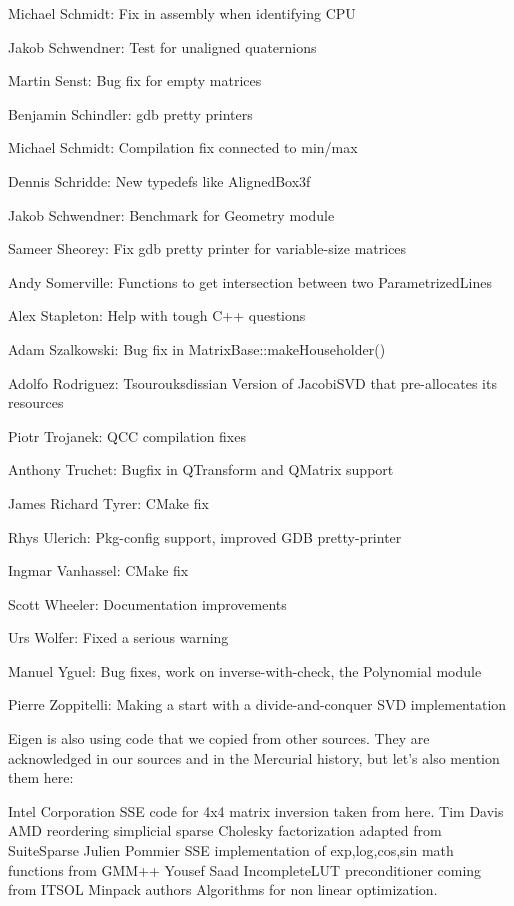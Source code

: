Michael Schmidt:  Fix in assembly when identifying CPU  

Jakob Schwendner:  Test for unaligned quaternions  

Martin Senst:  Bug fix for empty matrices  

Benjamin Schindler:  gdb pretty printers  

Michael Schmidt:  Compilation fix connected to min/max  

Dennis Schridde:  New typedefs like AlignedBox3f  

Jakob Schwendner:  Benchmark for Geometry module  

Sameer Sheorey:  Fix gdb pretty printer for variable-size matrices  

Andy Somerville:  Functions to get intersection between two ParametrizedLines  

Alex Stapleton:  Help with tough C++ questions  

Adam Szalkowski:  Bug fix in MatrixBase::makeHouseholder()  

Adolfo Rodriguez: Tsourouksdissian  Version of JacobiSVD that pre-allocates its resources  

Piotr Trojanek:  QCC compilation fixes  

Anthony Truchet:  Bugfix in QTransform and QMatrix support  

James Richard Tyrer:  CMake fix  

Rhys Ulerich:  Pkg-config support, improved GDB pretty-printer  

Ingmar Vanhassel:  CMake fix  

Scott Wheeler:  Documentation improvements  

Urs Wolfer:  Fixed a serious warning  

Manuel Yguel:  Bug fixes, work on inverse-with-check, the Polynomial module  

Pierre Zoppitelli:  Making a start with a divide-and-conquer SVD implementation  

\vpara
Eigen is also using code that we copied from other sources. They are acknowledged in our sources and in the Mercurial history, but let's also mention them here: 

\vpara
Intel Corporation  SSE code for 4x4 matrix inversion taken from here.  
Tim Davis  AMD reordering simplicial sparse Cholesky factorization adapted from SuiteSparse  
Julien Pommier  SSE implementation of exp,log,cos,sin math functions from GMM++  
Yousef Saad  IncompleteLUT preconditioner coming from ITSOL  
Minpack authors  Algorithms for non linear optimization.  

